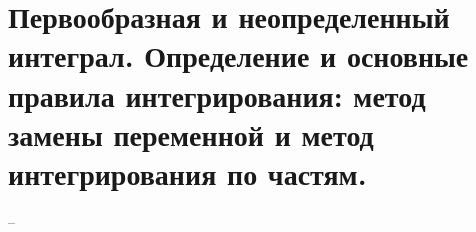\section{Первообразная и неопределенный интеграл. Определение и основные правила интегрирования: метод замены переменной и метод интегрирования по частям.}
--
\newline